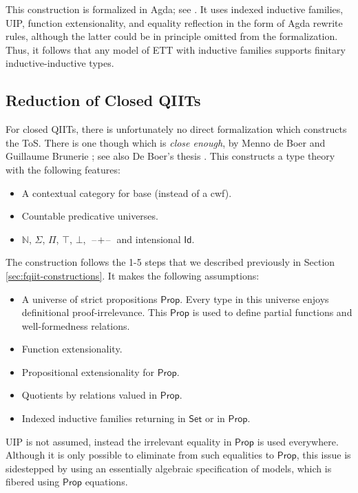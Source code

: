 \documentclass[12pt,a4paper,twoside,openany]{book}
\theoremstyle{remark}
\theoremstyle{definition}
\theoremstyle{theorem}
\newcommand{\ms}[1]{\mathsf{#1}}
\newcommand{\Id}{\mathsf{Id}}
\newcommand{\blank}{\mathord{\hspace{1pt}\text{--}\hspace{1pt}}}
\newcommand{\Set}{\mathsf{Set}}
\begin{document}
This construction is formalized in Agda; see \cite{ind-ind-reduction}. It uses
indexed inductive families, UIP, function extensionality, and equality
reflection in the form of Agda rewrite rules, although the latter could be in
principle omitted from the formalization. Thus, it follows that any model
of ETT with inductive families supports finitary inductive-inductive types.

\subsection{Reduction of Closed QIITs}

For closed QIITs, there is unfortunately no direct formalization which
constructs the ToS. There is one though which is \emph{close enough}, by Menno
de Boer and Guillaume Brunerie \cite{initiality-agda}; see also De Boer's thesis
\cite{deboer-initiality}. This constructs a type theory with the following
features:
\begin{itemize}
  \item A contextual category for base (instead of a cwf).
  \item Countable predicative universes.
  \item $\mathbb{N}$, $\Sigma$, $\Pi$, $\top$, $\bot$, $\blank\!+\!\blank$ and
        intensional $\Id$.
\end{itemize}
The construction follows the 1-5 steps that we described previously in Section \ref{sec:fqiit-constructions}. It makes the following assumptions:
\begin{itemize}
\item A universe of strict propositions $\ms{Prop}$. Every type in this universe
      enjoys definitional proof-irrelevance. This $\ms{Prop}$ is used to define
      partial functions and well-formedness relations.
\item Function extensionality.
\item Propositional extensionality for $\ms{Prop}$.
\item Quotients by relations valued in $\ms{Prop}$.
\item Indexed inductive families returning in $\Set$ or in $\ms{Prop}$.
\end{itemize}
UIP is not assumed, instead the irrelevant equality in $\ms{Prop}$ is used
everywhere. Although it is only possible to eliminate from such equalities to
$\ms{Prop}$, this issue is sidestepped by using an essentially algebraic
specification of models, which is fibered using $\ms{Prop}$ equations.
\end{document}
